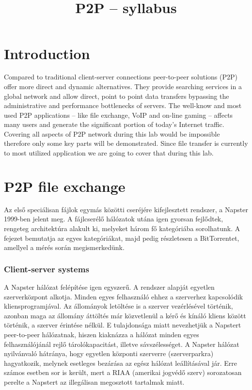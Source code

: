 \documentclass[a4paper]{article}
\title{P2P – syllabus}
\author{}
\date{}
\begin{document}
\maketitle

\tableofcontents

\section{Introduction}

Compared to traditional client-server connections peer-to-peer solutions (P2P) offer more direct and dynamic alternatives. They provide searching services in a global network and allow direct, point to point data transfers bypassing the administrative and performance bottlenecks of servers.
The well-know and most used P2P applications -- like file exchange, VoIP and on-line gaming -- affects many users and generate the significant portion of today's Internet traffic. Covering all aspects of P2P network during this lab would be impossible therefore only some key parts will be demonstrated. Since file transfer is currently to most utilized application we are going to cover that during this lab.

\section{P2P file exchange}

Az első speciálisan fájlok egymás közötti cseréjére kifejlesztett rendszer, a Napster 1999-ben jelent meg. A fájlcserélő hálózatok utána igen gyorsan fejlődtek, rengeteg architektúra alakult ki, melyeket három fő kategóriába sorolhatunk. A fejezet bemutatja az egyes kategóriákat, majd pedig részletesen a BitTorrentet, amellyel a mérés során megismerkedünk.

\subsubsection{Client-server systems}

A Napster hálózat felépítése igen egyszerű. A rendszer alapját egyetlen szerverközpont alkotja. Minden egyes felhasználó ehhez a szerverhez kapcsolódik kliensprogramjával. Az állományok letöltése is a szerver vezérlésével történik, azonban maga az állomány áttöltés már közvetlenül a kérő és kínáló kliens között történik, a szerver érintése nélkül. E tulajdonsága miatt nevezhetjük a Napstert peer-to-peer hálózatnak, hiszen kiaknázza a hálózat minden egyes felhasználójánál rejlő tárolókapacitást, illetve sávszélességet. A Napster hálózat nyilvánvaló hátránya, hogy egyetlen központi szerverre (szerverparkra) hagyatkozik, melynek esetleges bezárása az egész hálózat leállításával jár. Erre számos esetben sor is került, mert a RIAA (amerikai jogvédő szerv) sorozatosan perelte a Napstert az illegálisan megosztott tartalmak miatt.
\end{document}
